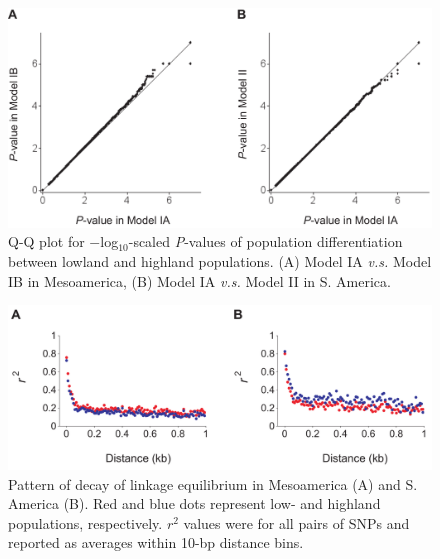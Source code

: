 \begin{figure}[h]
  \begin{center}
    \includegraphics[width=0.6\columnwidth]{fig/bot2.pdf}
    \caption{Q-Q plot for $-$log$_{10}$-scaled \emph{P}-values of population differentiation between lowland and highland populations. (A) Model IA \emph{v.s.} Model IB in Mesoamerica, (B) Model IA \emph{v.s.} Model II in S. America.}
    \label{fig:qq}
  \end{center}
\end{figure}



\begin{figure}[h]
  \begin{center}
    \includegraphics[width=0.7\columnwidth]{fig/LD.pdf}
    \caption{Pattern of decay of linkage equilibrium in Mesoamerica (A) and S. America (B).  Red and blue dots represent low- and highland populations, respectively.  $r^2$ values were for all pairs of SNPs and reported as averages within 10-bp distance bins. }
    \label{supp:LD}
  \end{center}
\end{figure}

